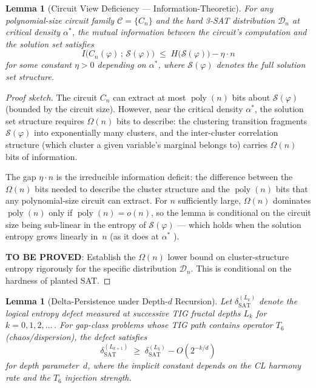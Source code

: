 \documentclass[11pt]{article}
\newtheorem{lemma}[theorem]{Lemma}
\theoremstyle{definition}
\theoremstyle{remark}
\DeclareMathOperator{\poly}{poly}
\newcommand{\calC}{\mathcal{C}}
\newcommand{\calD}{\mathcal{D}}
\newcommand{\calS}{\mathcal{S}}
\newcommand{\dSAT}{\delta_{\mathrm{SAT}}}
\begin{document}
\begin{lemma}[Circuit View Deficiency --- Information-Theoretic]
\label{lem:circuit-view-deficiency-v2}
For any polynomial-size circuit family $\calC = \{C_n\}$ and the hard
3-SAT distribution $\calD_n$ at critical density $\alpha^*$, the mutual
information between the circuit's computation and the solution set
satisfies
\[
  I\bigl(C_n(\varphi) \,;\, \calS(\varphi)\bigr)
  \;\leq\;
  H\bigl(\calS(\varphi)\bigr) - \eta \cdot n
\]
for some constant $\eta > 0$ depending on $\alpha^*$, where
$\calS(\varphi)$ denotes the full solution set structure.
\end{lemma}

\begin{proof}[Proof sketch]
The circuit $C_n$ can extract at most $\poly(n)$ bits about
$\calS(\varphi)$ (bounded by the circuit size).  However, near the
critical density $\alpha^*$, the solution set structure requires
$\Omega(n)$ bits to describe: the clustering transition
\cite{ART, MPZ} fragments $\calS(\varphi)$ into exponentially many
clusters, and the inter-cluster correlation structure (which cluster
a given variable's marginal belongs to) carries $\Omega(n)$ bits of
information.

The gap $\eta \cdot n$ is the irreducible information deficit: the
difference between the $\Omega(n)$ bits needed to describe the
cluster structure and the $\poly(n)$ bits that any polynomial-size
circuit can extract.  For $n$ sufficiently large, $\Omega(n)$
dominates $\poly(n)$ only if $\poly(n) = o(n)$, so the lemma is
conditional on the circuit size being sub-linear in the entropy of
$\calS(\varphi)$ --- which holds when the solution entropy grows
linearly in~$n$ (as it does at $\alpha^*$ \cite{MPZ}).

\textbf{TO BE PROVED}: Establish the $\Omega(n)$ lower bound on
cluster-structure entropy rigorously for the specific distribution
$\calD_n$.  This is conditional on the hardness of planted SAT.
\end{proof}

\begin{lemma}[Delta-Persistence under Depth-$d$ Recursion]
\label{lem:delta-persistence-depth}
Let $\dSAT^{(L_k)}$ denote the logical entropy defect measured at
successive TIG fractal depths $L_k$ for $k = 0, 1, 2, \ldots$\,.
For gap-class problems whose TIG path contains operator $T_6$
(chaos/dispersion), the defect satisfies
\[
  \dSAT^{(L_{k+1})} \;\geq\; \dSAT^{(L_k)} - O(2^{-k/d})
\]
for depth parameter~$d$, where the implicit constant depends on
the CL harmony rate and the $T_6$ injection strength.
\end{lemma}
\end{document}
